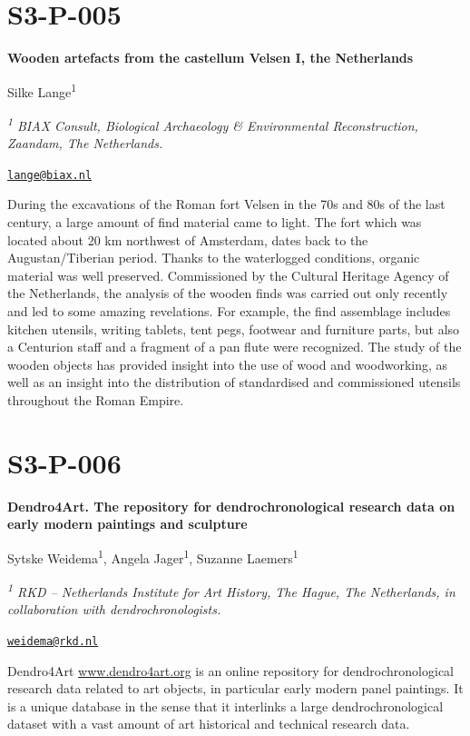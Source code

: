 \documentclass[
]{book}
\begin{document}
\hypertarget{s3-p-005}{%
\section*{S3-P-005}\label{s3-p-005}}

\textbf{Wooden artefacts from the castellum Velsen I, the Netherlands}

Silke Lange\textsuperscript{1}

\emph{\textsuperscript{1} BIAX Consult, Biological Archaeology \& Environmental Reconstruction, Zaandam, The Netherlands.}

\href{mailto:lange@biax.nl}{\nolinkurl{lange@biax.nl}}

During the excavations of the Roman fort Velsen in the 70s and 80s of the last century, a large amount of find material came to light. The fort which was located about 20 km northwest of Amsterdam, dates back to the Augustan/Tiberian period. Thanks to the waterlogged conditions, organic material was well preserved. Commissioned by the Cultural Heritage Agency of the Netherlands, the analysis of the wooden finds was carried out only recently and led to some amazing revelations. For example, the find assemblage includes kitchen utensils, writing tablets, tent pegs, footwear and furniture parts, but also a Centurion staff and a fragment of a pan flute were recognized. The study of the wooden objects has provided insight into the use of wood and woodworking, as well as an insight into the distribution of standardised and commissioned utensils throughout the Roman Empire.

\hypertarget{s3-p-006}{%
\section*{S3-P-006}\label{s3-p-006}}

\textbf{Dendro4Art. The repository for dendrochronological research data on early modern paintings and sculpture}

Sytske Weidema\textsuperscript{1}, Angela Jager\textsuperscript{1}, Suzanne Laemers\textsuperscript{1}

\emph{\textsuperscript{1} RKD -- Netherlands Institute for Art History, The Hague, The Netherlands, in collaboration with dendrochronologists.}

\href{mailto:weidema@rkd.nl}{\nolinkurl{weidema@rkd.nl}}

Dendro4Art \href{http://www.dendro4art.org}{www.dendro4art.org} is an online repository for dendrochronological research data related to art objects, in particular early modern panel paintings. It is a unique database in the sense that it interlinks a large dendrochronological dataset with a vast amount of art historical and technical research data.
\end{document}
